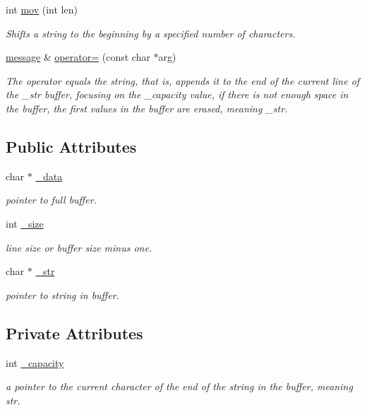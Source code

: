 \begin{DoxyCompactItemize}
int \hyperlink{classmessage_a6add30ca9731721b8b271a11c7279932}{mov} (int len)
\begin{DoxyCompactList}\small\item\em Shifts a string to the beginning by a specified number of characters. \end{DoxyCompactList}\item 
\hyperlink{classmessage}{message} \& \hyperlink{classmessage_a6264b8942d815bd3d999b2a9b6475825}{operator=} (const char $\ast$arg)
\begin{DoxyCompactList}\small\item\em The operator equals the string, that is, appends it to the end of the current line of the \+\_\+str buffer, focusing on the \+\_\+capacity value, if there is not enough space in the buffer, the first values in the buffer are erased, meaning \+\_\+str. \end{DoxyCompactList}\end{DoxyCompactItemize}
\subsection*{Public Attributes}
\begin{DoxyCompactItemize}
\item 
char $\ast$ \hyperlink{classmessage_a6d995411bcb21f78e2b123e9449df39c}{\+\_\+data}
\begin{DoxyCompactList}\small\item\em pointer to full buffer. \end{DoxyCompactList}\item 
int \hyperlink{classmessage_aaa6c8c862a2c0bc18c802314cc58961d}{\+\_\+size}
\begin{DoxyCompactList}\small\item\em line size or buffer size minus one. \end{DoxyCompactList}\item 
char $\ast$ \hyperlink{classmessage_a2606729876d9435e492e52b9ffca7968}{\+\_\+str}
\begin{DoxyCompactList}\small\item\em pointer to string in buffer. \end{DoxyCompactList}\end{DoxyCompactItemize}
\subsection*{Private Attributes}
\begin{DoxyCompactItemize}
\item 
int \hyperlink{classmessage_adc9ca8d1d3cf06b3975b6e768a942c61}{\+\_\+capacity}
\begin{DoxyCompactList}\small\item\em a pointer to the current character of the end of the string in the buffer, meaning str. \end{DoxyCompactList}\end{DoxyCompactItemize}


